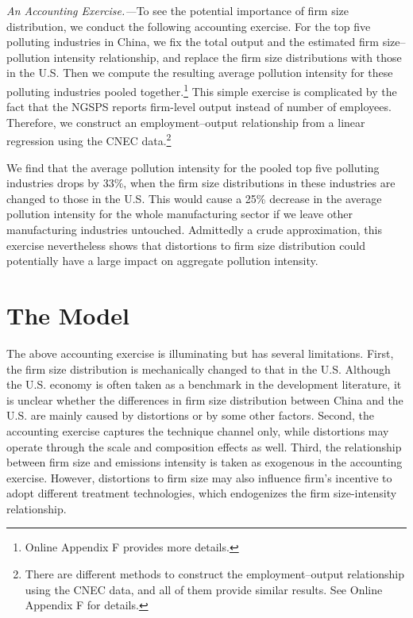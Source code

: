 \documentclass[AEJ]{AEA}
\begin{document}
\textit{An Accounting Exercise.---}To see the potential importance of firm size distribution, we conduct the following accounting exercise. For the top five polluting industries in China, we fix the total output and  the estimated firm size--pollution intensity relationship, and replace the firm size distributions with those in the U.S. Then we compute the resulting average pollution intensity for these polluting industries pooled together.\footnote{Online Appendix F provides more details.} This simple exercise is complicated by the fact that the NGSPS reports firm-level output instead of number of employees. Therefore, we construct an employment--output relationship from a linear regression using the CNEC data.\footnote{There are different methods to construct the employment--output relationship using the CNEC data, and all of them provide similar results. See Online Appendix F for details.} 

We find that the average pollution intensity for the pooled top five polluting industries drops by 33\%, when the firm size distributions in these industries are changed to those in the U.S. This would cause a 25\% decrease in the average pollution intensity for the whole manufacturing sector if we leave other manufacturing industries untouched. Admittedly a crude approximation, this exercise nevertheless shows that distortions to firm size distribution could potentially have a large impact on aggregate pollution intensity.

\section{The Model}

The above accounting exercise is illuminating but has several limitations. First, the firm size distribution is mechanically changed to that in the U.S. Although the U.S. economy is often taken as a benchmark in the development literature, it is unclear whether the differences in firm size distribution between China and the U.S. are mainly caused by distortions or by some other factors. Second, the accounting exercise captures the technique channel only, while distortions may operate through the scale and composition effects as well. Third, the relationship between firm size and emissions intensity is taken as exogenous in the accounting exercise. However, distortions to firm size may also influence firm's incentive to adopt different treatment technologies, which endogenizes the firm size-intensity relationship.
\end{document}
